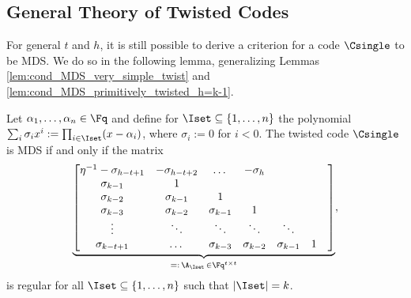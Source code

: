 \documentclass[conference,a4paper]{IEEEtran}
\begin{document}
\subsection{General Theory of Twisted Codes}
\label{subsec:Max_Length_MDS_General}

For general $t$ and $h$, it is still possible to derive a criterion for a code $\Csingle$ to be MDS. We do so in the following lemma, generalizing Lemmas \ref{lem:cond_MDS_very_simple_twist} and \ref{lem:cond_MDS_primitively_twisted_h=k-1}.

\begin{lemma}\label{lem:MDS_property_one_twist}
Let $\alpha_1,\dots,\alpha_n \in \Fq$ and define for $\Iset \subseteq \{1,\dots,n\}$ the polynomial $\sum_i \sigma_i x^i := \prod_{i \in \Iset} (x-\alpha_i)$, where $\sigma_i := 0$ for $i<0$. The twisted code $\Csingle$ is MDS if and only if the matrix
\begin{align*}
\underset{=: \, \A_\Iset \, \in \Fq^{t \times t}}{\underbrace{
\begin{bmatrix}
\eta^{-1} -\sigma_{h-t+1} & -\sigma_{h-t+2} & \dots  & -\sigma_{h} & \\
\sigma_{k-1} & 1 & & & & \\
\sigma_{k-2} & \sigma_{k-1} & 1 &  & & \\
\sigma_{k-3} & \sigma_{k-2} & \sigma_{k-1} & 1 &  & & \\
\vdots & \ddots & \ddots & \ddots & \ddots & & \\
\sigma_{k-t+1} & \dots &\sigma_{k-3} & \sigma_{k-2} & \sigma_{k-1} & 1\\
\end{bmatrix}
}},
\end{align*}
is regular for all $\Iset \subseteq \{1,\dots,n\}$ such that $|\Iset|=k$.
\end{lemma}
\end{document}
